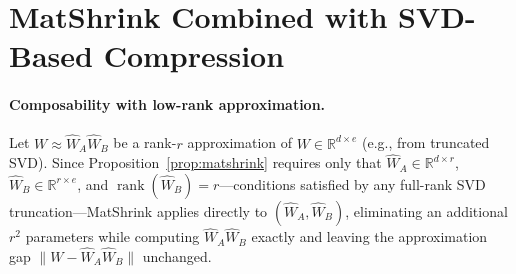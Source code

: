 \documentclass{article}
\newcommand{\WW}[1]{W_\text{#1}}                    %
\DeclareMathOperator{\rank}{rank}
\begin{document}


\section{MatShrink Combined with SVD-Based Compression}
\paragraph{Composability with low-rank approximation.}\label{prop:svd}
Let $W \approx \hat{W}_A \hat{W}_B$ be a rank-$r$ approximation of $W \in \mathbb{R}^{d \times e}$ (e.g., from truncated SVD). Since Proposition~\ref{prop:matshrink} requires only that $\hat{W}_A \in \mathbb{R}^{d \times r}$, $\hat{W}_B \in \mathbb{R}^{r \times e}$, and $\rank(\hat{W}_B) = r$---conditions satisfied by any full-rank SVD truncation---MatShrink applies directly to $(\hat{W}_A, \hat{W}_B)$, eliminating an additional $r^2$ parameters while computing $\hat{W}_A \hat{W}_B$ exactly and leaving the approximation gap $\|W - \hat{W}_A \hat{W}_B\|$ unchanged.
\end{document}
